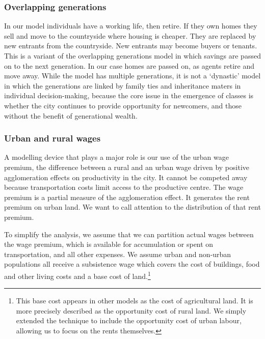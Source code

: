 \subsubsection{Overlapping generations}
In our model individuals have a working life, then retire. If they own homes they sell and move to the countryside where housing is cheaper. They are replaced by new entrants from the countryside. New entrants may become buyers or tenants. This is a variant of the \gls{overlapping generations  model} in which savings are passed on to the next generation. In our case homes are passed on, as agents retire and move away. While the model has multiple generations, it is not a `dynastic' model in which the generations are linked by family ties and inheritance maters in individual decision-making, because the core issue in the emergence of classes is whether the city continues to provide opportunity for newcomers, and those without the benefit of generational wealth. %

\subsubsection{Urban and rural wages}
A modelling device that plays a major role is our use of the \gls{urban wage premium}, the difference between a rural and an urban wage driven by positive agglomeration effects on productivity in the city. It cannot be competed away because transportation costs limit access to the productive centre. The wage premium is a partial measure of the agglomeration effect. It generates the \gls{rent premium} on urban land. We want to call attention to the distribution of that rent premium.

To simplify the analysis, we assume that we can partition actual wages between the wage premium, which is available for accumulation or spent on transportation, and all other expenses. We assume urban and non-urban populations all receive a \gls{subsistence wage} which covers  the cost of buildings, food and other living costs and a base cost of land.\footnote{This base cost appears in other models as the cost of agricultural land. It is more precisely described as the opportunity cost of rural land. We simply extended the technique to include the opportunity cost of urban labour, allowing us to focus on the rents themselves.} 

